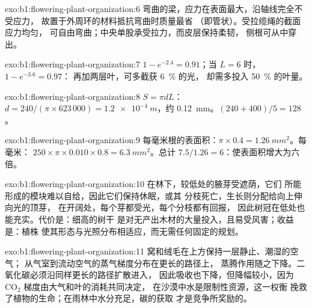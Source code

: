 \begin{solution}{exo:b1:flowering-plant-organization:6}
弯曲的梁，应力在表面最大，沿轴线完全不受应力，
故置于外周环的材料抵抗弯曲时质量最省
（即管状）。受拉缆绳的截面应力均匀，
可自由弯曲；中央单股承受拉力，而皮层保持柔韧，
侧根可从中穿出。
\end{solution}

\begin{solution}{exo:b1:flowering-plant-organization:7}
$1 - e^{-2.4} = 0.91$；当 $L = 6$ 时，$1 - e^{-3.6} = 0.97$：
再加两层叶，可多截获 \qty{6}{\%} 的光，
却需多投入 \qty{50}{\%} 的叶量。
\end{solution}

\begin{solution}{exo:b1:flowering-plant-organization:8}
$S = \pi d L$：$d = 240/(\pi\times 623\,000) = \qty{1.2e-4}{m}$，约
\qty{0.12}{mm}。$(240 + 400)/5 = 128$。
\end{solution}

\begin{solution}{exo:b1:flowering-plant-organization:9}
每毫米根的表面积：$\pi\times 0.4 = \qty{1.26}{mm^2}$。每毫米：
$250\times\pi\times 0.010\times 0.8 = \qty{6.3}{mm^2}$。总计
$7.5/1.26 = 6$：使表面积增大为六倍。
\end{solution}

\begin{solution}{exo:b1:flowering-plant-organization:10}
在林下，较低处的腋芽受遮荫，它们
所能形成的模块难以自给，因此它们保持休眠，或其
分枝死亡，生长则分配给向上伸向光的顶芽，
在开阔处，每个芽都受光，每个分枝都有回报，
因此树冠在低处也能充实。代价是：细高的树干
是对无产出木材的大量投入，且易受风害；收益是：植株
使其形态与光照分布相适应，而无需任何固定的规划。
\end{solution}

\begin{solution}{exo:b1:flowering-plant-organization:11}
窝和绒毛在上方保持一层静止、潮湿的空气；
从气室到流动空气的蒸气梯度分布在更长的路径上，
蒸腾作用随之下降。二氧化碳必须沿同样更长的路径扩散进入，
因此吸收也下降，但降幅较小，因为
$\mathrm{CO_2}$ 梯度由大气和叶的消耗共同决定，
在沙漠中水是限制性资源，这一权衡
挽救了植物的生命；在雨林中水分充足，碳的获取
才是竞争所奖励的。
\end{solution}

